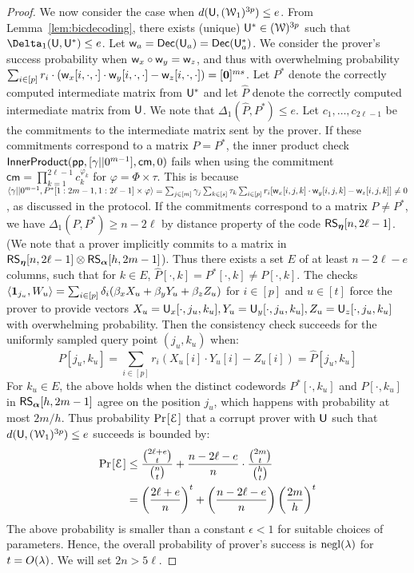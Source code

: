 \begin{proof}
	We now consider the case when $d(\mathsf{U},(\mathcal{W}_1)^{3p})\leq e$. From Lemma~\ref{lem:bicdecoding}, there exists (unique) $\mathsf{U}^*\in (\mathcal{W})^{3p}$ such that $\Delta_1(\ewit,\ewit^*)\leq e$. Let $\mathsf{w}_a=\mathsf{Dec}(\mathsf{U}_a)=\mathsf{Dec}(\mathsf{U}^*_a)$. We consider the prover's success probability when $\mathsf{w}_x\circ \mathsf{w}_y = \mathsf{w}_z$, and thus with overwhelming probability $\sum_{i\in[p]} r_i\cdot(\mathsf{w}_x[i,\cdot,\cdot]\cdot\mathsf{w}_y[i,\cdot,\cdot]-\mathsf{w}_z[i,\cdot,\cdot]) = [\bm{0}]^{ms}$. Let $P^*$ denote the correctly computed intermediate matrix from $\mathsf{U}^*$ and let $\hat{P}$ denote the correctly computed intermediate matrix from $\mathsf{U}$. We note that $\Delta_1(\hat{P},P^*)\leq e$. Let $c_1, \ldots, c_{2\ell-1}$ be the commitments to the intermediate matrix sent by the prover. If these commitments correspond to a matrix $P=P^*$, the inner product check	$\mathsf{InnerProduct}(\mathsf{pp},[\gamma||0^{m-1}],\mathsf{cm},0)$ fails when using the commitment $\mathsf{cm}=\prod_{k=1}^{2\ell-1}c_k^{\varphi_k}$ for	$\varphi=\Phi\times \tau$. This is because $\langle \gamma||0^{m-1},P^*[1:2m-1,1:2\ell-1]\times \varphi\rangle=\sum_{j\in[m]} \gamma_j\sum_{k\in[s]} \tau_k \sum_{i\in[p]} r_i [\mathsf{w}_x[i,j,k] \cdot \mathsf{w}_y[i,j,k] - \mathsf{w}_z[i,j,k] ] \neq 0$, as discussed in the protocol. If the commitments correspond to a matrix $P\neq P^*$, we have $\Delta_1(P,P^*)\geq n-2\ell$ by distance property of the code $\mathsf{RS}_{\bm{\eta}}[n, 2\ell-1]$. (We note that a prover implicitly commits to a matrix in	$\mathsf{RS}_{\bm{\eta}}[n,2\ell-1]\otimes \mathsf{RS}_{\bm{\alpha}}[h,2m-1]$). Thus there exists a set $E$ of at least $n-2\ell-e$ columns, such that for $k\in E$, $\hat{P}[\cdot,k]=P^*[\cdot,k]\neq P[\cdot,k]$. The checks $\langle \bm{1}_{j_u},W_u\rangle=\sum_{i\in[p]}\delta_i(\beta_x X_u + \beta_y Y_u + \beta_z Z_u)$ for $i\in [p]$ and $u\in [t]$ force the prover to provide vectors $X_u=\mathsf{U}_x[\cdot,j_u,k_u], Y_u=\mathsf{U}_y[\cdot,j_u,k_u], Z_u=\mathsf{U}_z[\cdot,j_u,k_u]$ with overwhelming probability. Then the consistency check succeeds for the uniformly sampled query point $(j_u,k_u)$ when:
	\[ P[j_u,k_u] = \sum_{i\in [p]}r_i(X_u[i]\cdot Y_u[i]-Z_u[i]) =	\hat{P}[j_u,k_u] \]
	For $k_u\in E$, the above holds when the distinct codewords $P^*[\cdot,k_u]$ and $P[\cdot,k_u]$ in $\mathsf{RS}_{\bm{\alpha}}[h,2m-1]$ agree on the position $j_u$, which happens with probability at most $2m/h$. Thus probability $\prob{\mc{E}}$ that a corrupt prover with $\mathsf{U}$ such that $d(\mathsf{U}, (\mathcal{W}_1)^{3p}) \leq e$ succeeds is bounded by:
	\begin{align*}
	\prob{\mc{E}}&\leq \frac{\binom{2\ell+e}{t}}{\binom{n}{t}} + \frac{{n-2\ell-e}}{{n}} \cdot \frac{\binom{2m}{t}}{\binom{h}{t}}\\
	&= \left( \frac{2\ell + e}{n} \right)^t + \left( \frac{n - 2\ell -e}{n}\right) \left(\frac{2m}{h}\right)^t
	\end{align*}
	The above probability is smaller than a constant $\epsilon < 1$ for suitable choices of parameters. Hence, the overall probability of prover's success is $\mathrm{negl}(\lambda)$ for $t=O(\lambda)$.
	We will set $2n>5\ell$. 
	\smallskip

\end{proof}

